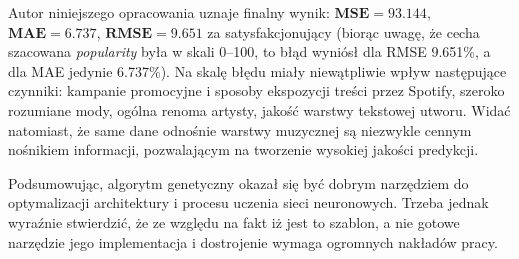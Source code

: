 \documentclass[a4paper,12pt]{article}
\numberwithin{figure}{section}
\begin{document}
    \bigskip

    Autor niniejszego opracowania uznaje finalny wynik: $\bm{MSE = 93.144}$, $\bm{MAE = 6.737}$, $\bm{RMSE = 9.651}$ za satysfakcjonujący (biorąc uwagę, że cecha szacowana \textit{popularity} była w skali 0--100, to błąd wyniósł dla RMSE 9.651\%, a dla MAE jedynie 6.737\%). Na skalę błędu miały niewątpliwie wpływ następujące czynniki: kampanie promocyjne i sposoby ekspozycji treści przez Spotify, szeroko rozumiane mody, ogólna renoma artysty, jakość warstwy tekstowej utworu. Widać natomiast, że same dane odnośnie warstwy muzycznej są niezwykle cennym nośnikiem informacji, pozwalającym na tworzenie wysokiej jakości predykcji.

    \bigskip

    Podsumowując, algorytm genetyczny okazał się być dobrym narzędziem do optymalizacji architektury i procesu uczenia sieci neuronowych. Trzeba jednak wyraźnie stwierdzić, że ze względu na fakt iż jest to szablon, a nie gotowe narzędzie jego implementacja i dostrojenie wymaga ogromnych nakładów pracy.

    \newpage


    \printbibliography
\end{document}
